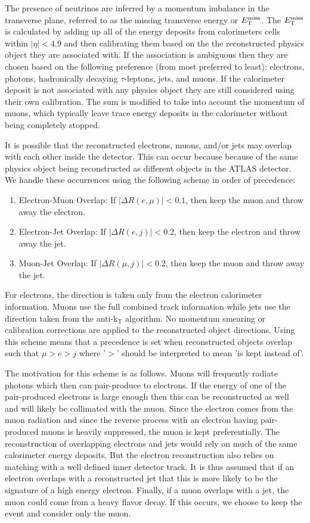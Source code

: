 The presence of neutrinos are inferred by a momentum
imbalance in the transverse plane, referred to as the missing
transverse energy or $E_{\mathrm{T}}^{\mathrm{miss}}$. The $E_{\mathrm{T}}^{\mathrm{miss}}$ is calculated by 
adding up all of 
the energy deposits from calorimeters cells within $|\eta| < 4.9$
and then calibrating them based on the the reconstructed
physics object they are associated with.
If the association is ambiguous then they are chosen based on the following
preference (from most preferred to least): electrons, photons, 
hadronically decaying $\tau$-leptons, jets, and muons.
If the calorimeter deposit is not associated with any physics object
they are still considered using their own calibration.
The sum is modified to take into account the momentum of muons,
which typically leave trace energy deposits
in the calorimeter without being completely stopped.



It is possible that the reconstructed electrons, muons, and/or jets
may overlap with each other inside the detector.  This can occur
because because of the same physics object being reconstructed as different
objects in the ATLAS detector.  We handle these occurrences using the following
scheme in order of precedence:
\begin{enumerate}
	\item Electron-Muon Overlap: If $|\Delta R(e,\mu)| < 0.1$, 
	then keep the muon and throw away the electron.
	\item Electron-Jet Overlap: If $|\Delta R(e,j)| < 0.2$, 
	then keep the electron and throw away the jet.
	\item Muon-Jet Overlap: If $|\Delta R(\mu,j)| < 0.2$, 
	then keep the muon and throw away the jet.
\end{enumerate}
For electrons, the direction is taken only from the electron calorimeter
information.  Muons use the full combined track information while jets
use the direction taken from the anti-k$_{\mathrm{T}}$  algorithm.
No momentum smearing or calibration corrections
are applied to the reconstructed object directions. 
Using this scheme means that a precedence is set when 
reconstructed objects overlap such that $\mu > e > j$ where '$>$' should
be interpreted to mean 'is kept instead of'. 

The motivation for this scheme
is as follows. Muons will frequently radiate photons which then can pair-produce
to electrons.  If the energy of one of the pair-produced electrons is 
large enough then this can be reconstructed as well and will likely be collimated
with the muon.  Since the electron comes from the muon radiation and
since the reverse process with an electron having pair-produced muons
is heavily suppressed, the muon is kept preferentially.  The reconstruction
of overlapping electrons and jets
would rely on much of the same calorimeter energy deposits.  But the electron
reconstruction also relies on matching with a well defined inner detector
track.  It is thus assumed that if an electron overlaps with a reconstructed
jet that this is more likely to be the signature of a high energy electron.
Finally, if a muon overlaps with a jet, the muon could come from a heavy flavor 
decay. If this occurs, we choose to keep the event and consider only the muon.



